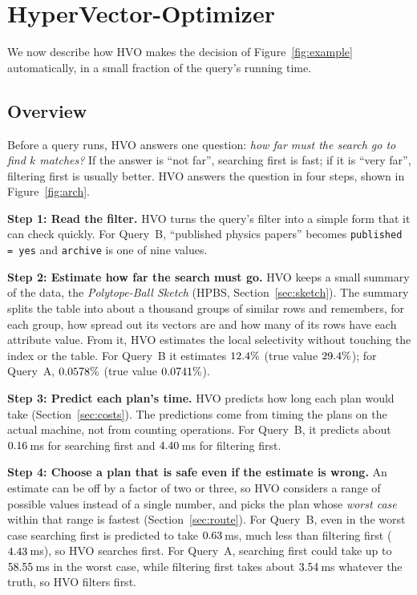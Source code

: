 \documentclass[sigconf, nonacm]{acmart}
\begin{document}
\section{HyperVector-Optimizer}\label{sec:method}
We now describe how HVO makes the decision of Figure~\ref{fig:example} automatically, in a small fraction of the query's running time.

\subsection{Overview}\label{sec:overview}
Before a query runs, HVO answers one question: \emph{how far must the search go to find $k$ matches?} If the answer is ``not far'', searching first is fast; if it is ``very far'', filtering first is usually better. HVO answers the question in four steps, shown in Figure~\ref{fig:arch}.

\noindent\textbf{Step 1: Read the filter.} HVO turns the query's filter into a simple form that it can check quickly. For Query~B, ``published physics papers'' becomes \texttt{published = yes} and \texttt{archive} is one of nine values.

\noindent\textbf{Step 2: Estimate how far the search must go.} HVO keeps a small summary of the data, the \emph{Polytope-Ball Sketch} (HPBS, Section~\ref{sec:sketch}). The summary splits the table into about a thousand groups of similar rows and remembers, for each group, how spread out its vectors are and how many of its rows have each attribute value. From it, HVO estimates the local selectivity without touching the index or the table. For Query~B it estimates $12.4\%$ (true value $29.4\%$); for Query~A, $0.0578\%$ (true value $0.0741\%$).

\noindent\textbf{Step 3: Predict each plan's time.} HVO predicts how long each plan would take (Section~\ref{sec:costs}). The predictions come from timing the plans on the actual machine, not from counting operations. For Query~B, it predicts about $0.16$\,ms for searching first and $4.40$\,ms for filtering first.

\noindent\textbf{Step 4: Choose a plan that is safe even if the estimate is wrong.} An estimate can be off by a factor of two or three, so HVO considers a range of possible values instead of a single number, and picks the plan whose \emph{worst case} within that range is fastest (Section~\ref{sec:route}). For Query~B, even in the worst case searching first is predicted to take $0.63$\,ms, much less than filtering first ($4.43$\,ms), so HVO searches first. For Query~A, searching first could take up to $58.55$\,ms in the worst case, while filtering first takes about $3.54$\,ms whatever the truth, so HVO filters first.
\end{document}
